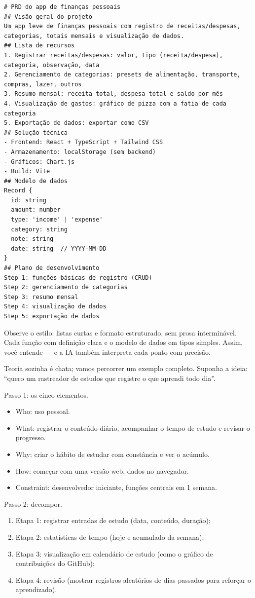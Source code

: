 \begin{lstlisting}
# PRD do app de finanças pessoais
## Visão geral do projeto
Um app leve de finanças pessoais com registro de receitas/despesas, categorias, totais mensais e visualização de dados.
## Lista de recursos
1. Registrar receitas/despesas: valor, tipo (receita/despesa), categoria, observação, data
2. Gerenciamento de categorias: presets de alimentação, transporte, compras, lazer, outros
3. Resumo mensal: receita total, despesa total e saldo por mês
4. Visualização de gastos: gráfico de pizza com a fatia de cada categoria
5. Exportação de dados: exportar como CSV
## Solução técnica
- Frontend: React + TypeScript + Tailwind CSS
- Armazenamento: localStorage (sem backend)
- Gráficos: Chart.js
- Build: Vite
## Modelo de dados
Record {
  id: string
  amount: number
  type: 'income' | 'expense'
  category: string
  note: string
  date: string  // YYYY-MM-DD
}
## Plano de desenvolvimento
Step 1: funções básicas de registro (CRUD)
Step 2: gerenciamento de categorias
Step 3: resumo mensal
Step 4: visualização de dados
Step 5: exportação de dados
\end{lstlisting}

Observe o estilo: listas curtas e formato estruturado, sem prosa interminável. Cada função com definição clara e o modelo de dados em tipos simples. Assim, você entende — e a IA também interpreta cada ponto com precisão.


Teoria sozinha é chata; vamos percorrer um exemplo completo. Suponha a ideia: “quero um rastreador de estudos que registre o que aprendi todo dia”.

Passo 1: os cinco elementos.

\begin{itemize}
  \item Who: uso pessoal.
  \item What: registrar o conteúdo diário, acompanhar o tempo de estudo e revisar o progresso.
  \item Why: criar o hábito de estudar com constância e ver o acúmulo.
  \item How: começar com uma versão web, dados no navegador.
  \item Constraint: desenvolvedor iniciante, funções centrais em 1 semana.
\end{itemize}

Passo 2: decompor.

\begin{enumerate}
  \item Etapa 1: registrar entradas de estudo (data, conteúdo, duração);
  \item Etapa 2: estatísticas de tempo (hoje e acumulado da semana);
  \item Etapa 3: visualização em calendário de estudo (como o gráfico de contribuições do GitHub);
  \item Etapa 4: revisão (mostrar registros aleatórios de dias passados para reforçar o aprendizado).
\end{enumerate}


